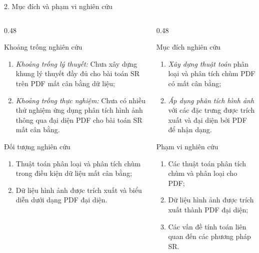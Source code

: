 \documentclass[oneside, aspectratio=169]{beamer}
\begin{document}
\begin{frame}{2. Mục đích và phạm vi nghiên cứu}\footnotesize
	
	\begin{columns}[t,onlytextwidth]
		
		\begin{column}{0.48\textwidth}
			
			\begin{block}{Khoảng trống nghiên cứu}
				\begin{enumerate}
					\item \textit{Khoảng trống lý thuyết:} Chưa xây dựng khung lý thuyết đầy đủ cho bài toán SR trên PDF mất cân bằng dữ liệu;
					\item \textit{Khoảng trống thực nghiệm:} Chưa có nhiều thử nghiệm ứng dụng phân tích hình ảnh thông qua đại diện PDF cho bài toán SR mất cân bằng.
				\end{enumerate}
			\end{block}
			
						\begin{block}{Đối tượng nghiên cứu}
				\begin{enumerate}
					\item Thuật toán phân loại và phân tích chùm trong điều kiện dữ liệu mất cân bằng;
					\item Dữ liệu hình ảnh được trích xuất và biểu diễn dưới dạng PDF đại diện.
				\end{enumerate}
			\end{block}
			
		\end{column}
		
		\begin{column}{0.48\textwidth}
			
	\begin{block}{Mục đích nghiên cứu}
	\begin{enumerate}
		\item \textcolor{CTUblue}{\textit{Xây dựng thuật toán}} phân loại và phân tích chùm PDF có mất cân bằng;
		\item \textcolor{CTUblue}{\textit{Áp dụng phân tích hình ảnh}} với các đặc trưng được trích xuất và đại diện bởi PDF để nhận dạng.
	\end{enumerate}
\end{block}
			
			\begin{block}{Phạm vi nghiên cứu}
				\begin{enumerate}
					\item Các thuật toán phân tích chùm và phân loại cho PDF;
					\item Dữ liệu hình ảnh được trích xuất thành PDF đại diện;
					\item Các vấn đề tính toán liên quan đến các phương pháp SR.
				\end{enumerate}
			\end{block}
			
		\end{column}
		
	\end{columns}
	
\end{frame}
\end{document}
